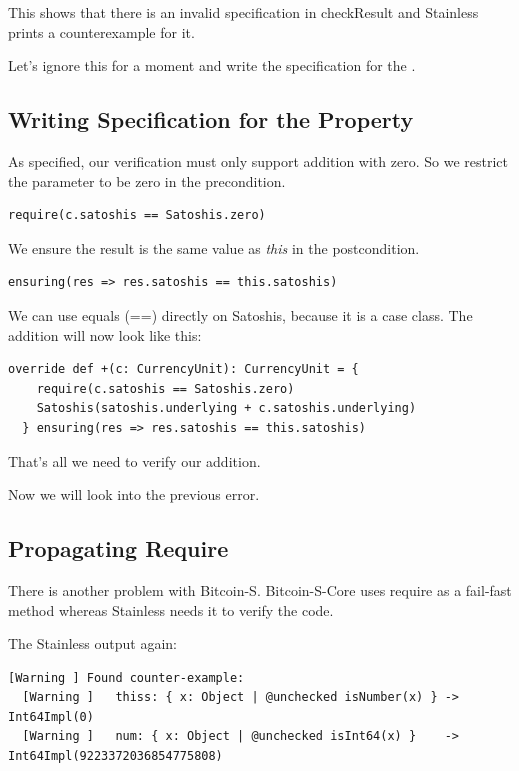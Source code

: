 \documentclass[runningheads]{llncs}
\begin{document}
This shows that there is an invalid specification in checkResult and Stainless prints a counterexample for it.

Let's ignore this for a moment and write the specification for the .


\subsection{Writing Specification for the Property}

As specified, our verification must only support addition with zero.
So we restrict the parameter to be zero in the precondition.
\begin{lstlisting}[style=scala]
  require(c.satoshis == Satoshis.zero)
\end{lstlisting}

We ensure the result is the same value as \emph{this} in the postcondition.
\begin{lstlisting}[style=scala]
  ensuring(res => res.satoshis == this.satoshis)
\end{lstlisting}

We can use equals (==) directly on Satoshis, because it is a case class.
The addition will now look like this:
\begin{lstlisting}[style=scala]
  override def +(c: CurrencyUnit): CurrencyUnit = {
    require(c.satoshis == Satoshis.zero)
    Satoshis(satoshis.underlying + c.satoshis.underlying)
  } ensuring(res => res.satoshis == this.satoshis)
\end{lstlisting}

That's all we need to verify our addition.

Now we will look into the previous error.


\subsection{Propagating Require}

There is another problem with Bitcoin-S.
Bitcoin-S-Core uses require as a fail-fast method whereas Stainless needs it to verify the code.

The Stainless output again:
\begin{lstlisting}[style=stainless]
  [Warning ] Found counter-example:
  [Warning ]   thiss: { x: Object | @unchecked isNumber(x) } -> Int64Impl(0)
  [Warning ]   num: { x: Object | @unchecked isInt64(x) }    -> Int64Impl(9223372036854775808)
\end{lstlisting}
\end{document}
